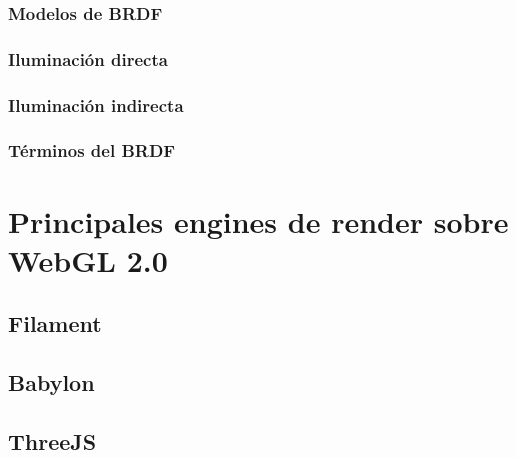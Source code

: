         \subsubsection{Modelos de BRDF}
        \subsubsection{Iluminaci\'on directa}
        \subsubsection{Iluminaci\'on indirecta}

        \subsubsection{T\'erminos del BRDF}
        \newpage

\section{Principales engines de render sobre WebGL 2.0}
    \subsection{Filament}
    \subsection{Babylon}
    \subsection{ThreeJS}
